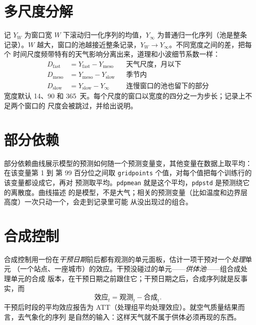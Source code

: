 \documentclass[11pt]{ctexrep}
\newcommand{\codeunderscore}{\textunderscore\allowbreak}
\newcommand{\code}[1]{\texttt{\let\_\codeunderscore #1}}
\begin{document}
\section{多尺度分解}\label{sec:multiscale}
记 $Y_W$ 为窗口宽 $W$ 下滚动归一化序列的均值，$Y_\infty$ 为普通归一化序列（池是整条
记录）。$W$ 越大，窗口的池越接近整条记录，$Y_W \to Y_\infty$。不同宽度之间的差，把每个
时间尺度频带特有的天气影响分离出来，道理和小波细节系数一样：
\begin{align}
  D_\text{fast} &= Y_\text{fast} - Y_\text{meso} && \text{天气尺度，月以下} \\
  D_\text{meso} &= Y_\text{meso} - Y_\text{slow} && \text{季节内} \\
  D_\text{slow} &= Y_\text{slow} - Y_\infty      && \text{连慢窗口的池也留下的部分}
\end{align}
宽度默认 14、90 和 365~天。每个尺度的窗口以宽度的四分之一为步长；记录上不足两个窗口的
尺度会被跳过，并给出说明。

\section{部分依赖}\label{sec:pdptheory}
部分依赖曲线展示模型的预测如何随一个预测变量变，其他变量在数据上取平均：在该变量第 1 到
第 99 百分位之间取 \code{grid\_points} 个值，对每个值把每个训练行的该变量都设成它，再对
预测取平均。\code{pdp\_mean} 就是这个平均，\code{pdp\_std} 是预测绕它的离散度。曲线描述
的是模型，不是大气；相关的预测变量（比如温度和边界层高度）一次只动一个，会走到记录里可能
从没出现过的组合。

\section{合成控制}\label{sec:scmtheory}
合成控制用一份在\emph{干预日期}前后都有观测的单元面板，估计一项干预对一个\emph{处理}单元
（一个站点、一座城市）的效应。干预没碰过的单元——\emph{供体池}——组合成处理单元的合成
版本，在干预日期之前跟住它；干预日期之后，合成序列就是反事实，而
\begin{equation}
  \text{效应}_t = \text{观测}_t - \text{合成}_t .
\end{equation}
干预后时段的平均效应报告为 ATT（处理组平均处理效应）。就空气质量结果而言，去气象化的序列
是自然的输入：这样天气就不属于供体必须再现的东西。
\end{document}
